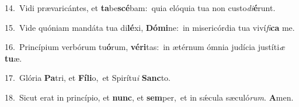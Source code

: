 {\numbfont\textcolor{\numbcolor}{14.}}~Vidi prævaricántes, et \textbf{ta}\-be\-\textbf{scé}\-bam:~\star quia elóquia tua non custo\-\textit{di}\-\textbf{é}runt.\par
{\numbfont\textcolor{\numbcolor}{15.}}~Vide quóniam mandáta tua di\-\textbf{lé}\-xi, \textbf{Dó}\-\textbf{mi}ne:~\star in misericórdia tua viví\-\textit{fi}\-\textbf{ca} me.\par
{\numbfont\textcolor{\numbcolor}{16.}}~Princípium verbórum tu\-\textbf{ó}\-rum, \textbf{vé}\-\textbf{ri}tas:~\star in ætérnum ómnia judícia justíti\textit{æ} \textbf{tu}\-æ.\par
{\numbfont\textcolor{\numbcolor}{17.}}~Glória \textbf{Pa}\-tri, et \textbf{Fí}\-\textbf{li}o,~\star et Spirítu\textit{i} \textbf{Sanc}\-to.\par
{\numbfont\textcolor{\numbcolor}{18.}}~Sicut erat in princípio, et \textbf{nunc}\-, et \textbf{sem}\-per,~\star et in sǽcula sæculó\-\textit{rum}\-. \textbf{A}\-men.\par
